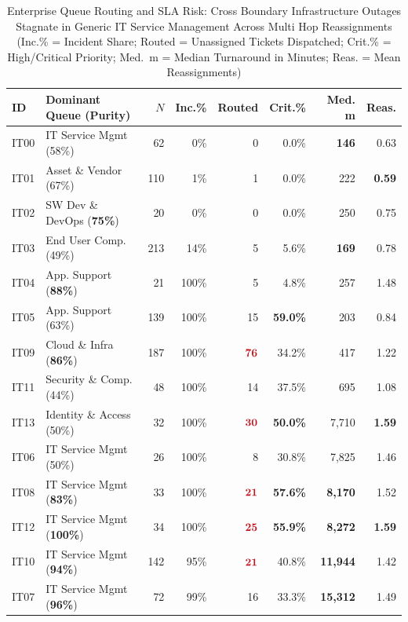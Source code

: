 \documentclass[sigconf,anonymous,pbalance]{acmart}
\newcommand{\hl}[1]{\textcolor{hlred}{\mathbf{#1}}}
\newcommand{\hlt}[1]{\textcolor{hlred}{\textbf{#1}}}
\begin{document}
\begin{table}[!htbp]
  \caption{Enterprise Queue Routing and SLA Risk: Cross Boundary Infrastructure Outages Stagnate in Generic IT Service Management Across Multi Hop Reassignments (Inc.\% = Incident Share; Routed = Unassigned Tickets Dispatched; Crit.\% = High/Critical Priority; Med.~m = Median Turnaround in Minutes; Reas. = Mean Reassignments)}
  \label{tab:exp9}
  \footnotesize
  \setlength{\tabcolsep}{2.0pt}
  \begin{tabular}{llrrrrrr}
    \toprule
    ID & Dominant Queue (Purity) & $N$ & Inc.\% & Routed & Crit.\% & Med. m & Reas. \\
    \midrule
    IT00 & IT Service Mgmt (58\%) & 62 & 0\% & 0 & 0.0\% & \hlt{146} & 0.63 \\
    IT01 & Asset \& Vendor (67\%) & 110 & 1\% & 1 & 0.0\% & 222 & \hlt{0.59} \\
    IT02 & SW Dev \& DevOps (\hlt{75\%}) & 20 & 0\% & 0 & 0.0\% & 250 & 0.75 \\
    IT03 & End User Comp. (49\%) & 213 & 14\% & 5 & 5.6\% & \hlt{169} & 0.78 \\
    IT04 & App. Support (\hlt{88\%}) & 21 & 100\% & 5 & 4.8\% & 257 & 1.48 \\
    IT05 & App. Support (63\%) & 139 & 100\% & 15 & \hlt{59.0\%} & 203 & 0.84 \\
    IT09 & Cloud \& Infra (\hlt{86\%}) & 187 & 100\% & $\hl{76}$ & 34.2\% & 417 & 1.22 \\
    IT11 & Security \& Comp. (44\%) & 48 & 100\% & 14 & 37.5\% & 695 & 1.08 \\
    IT13 & Identity \& Access (50\%) & 32 & 100\% & $\hl{30}$ & \hlt{50.0\%} & 7,710 & \hlt{1.59} \\
    IT06 & IT Service Mgmt (50\%) & 26 & 100\% & 8 & 30.8\% & 7,825 & 1.46 \\
    IT08 & IT Service Mgmt (\hlt{83\%}) & 33 & 100\% & $\hl{21}$ & \hlt{57.6\%} & \hlt{8,170} & 1.52 \\
    IT12 & IT Service Mgmt (\hlt{100\%}) & 34 & 100\% & $\hl{25}$ & \hlt{55.9\%} & \hlt{8,272} & \hlt{1.59} \\
    IT10 & IT Service Mgmt (\hlt{94\%}) & 142 & 95\% & $\hl{21}$ & 40.8\% & \hlt{11,944} & 1.42 \\
    IT07 & IT Service Mgmt (\hlt{96\%}) & 72 & 99\% & 16 & 33.3\% & \hlt{15,312} & 1.49 \\
    \bottomrule
  \end{tabular}
\end{table}
\end{document}
